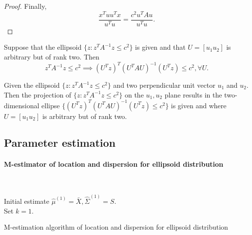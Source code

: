 \begin{refsection}
\begin{proof}
Finally, $$\frac{x^Tuu^Tx}{u^Tu} = \frac{c^2 u^T A u}{u^T u}.$$ 
\end{proof}


\begin{lemma}\cite[259]{johnson2007applied}
Suppose that the ellipsoid $\{z: z^TA^{-1}z \leq c^2\}$ is given and that $U = [u_1 u_2]$ is arbitrary but of rank two. Then
$$z^T A^{-1} z \leq c^2 \implies (U^T z)^T(U^T A U)^{-1}(U^Tz)\leq c^2, \forall U.$$	
\end{lemma}



\begin{lemma}\cite[259]{johnson2007applied}
	Given the ellipsoid $\{z: z^TA^{-1}z \leq c^2\}$ and two perpendicular unit vector $u_1$ and $u_2$. Then the projection of $\{z:z^TA^{-1}z\leq c^2\}$ on the $u_1,u_2$ plane results in the two-dimensional ellipse $\{(U^T z)^T(U^T A U)^{-1}(U^Tz)\leq c^2 \}$ is given and where $U = [u_1 u_2]$ is arbitrary but of rank two.
\end{lemma}

\subsection{Parameter estimation}


\paragraph{M-estimator of location and dispersion for ellipsoid distribution}

\begin{algorithm}[H][]\
	\SetAlgoLined
	
	Initial estimate $\hat{\mu}^(1) = \bar{X}, \hat{\Sigma}^{(1)} = S$.\\
	Set $k=1$.\\
	
	\KwOut{$\hat{\mu},\hat{\Sigma}$}
	\caption{M-estimation algorithm of location and dispersion for ellipsoid distribution}
\end{algorithm}


\end{refsection}
